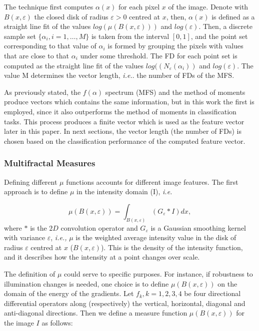 \documentclass[twocolumn]{bmcart}%
\begin{document}
The technique first computes $\alpha(x)$ for each pixel $x$ of the image. Denote with $B(x,\varepsilon)$ the closed disk of radius $\varepsilon > 0$ centred at $x$, then, $\alpha(x)$ is defined as a straight line fit of the values $log(\mu(B(x,\varepsilon)))$ and $log(\varepsilon)$. Then, a discrete sample set $\{\alpha_{i}, i = 1,\dots,M\}$ is taken from the interval $[0,1]$, and the point set corresponding to that value of $\alpha_{i}$ is formed by grouping the pixels with values that are close to that $\alpha_{i}$ under some threshold. The FD for each point set is computed as the straight line fit of the values $log((N_{\varepsilon}(\alpha_{i}))$ and $log(\varepsilon)$. The value M determines the vector length, {\em i.e.}. the number of FDs of the MFS.


As previously stated, the $f(\alpha)$ spectrum (MFS) and the method of moments produce vectors which contains the same information, but in this work the first is employed, since it also outperforms the method of moments in classification tasks. This process produces a finite vector which is used as the feature vector later in this paper. In next sections, the vector length (the number of FDs) is chosen based on the classification performance of the computed feature vector.


\subsubsection{Multifractal Measures}
Defining different $\mu$ functions accounts for different image features. The first approach is to define $\mu$ in the intensity domain (I), {\em i.e.}

\begin{equation}
\mu(B(x,\varepsilon)) = \int_{B(x,\varepsilon)}{(G_{\varepsilon} \ast I)} dx,
\label{eqn:eqn11}
\end{equation}
where $\ast$ is the $2D$ convolution operator and $G_{\varepsilon}$ is a Gaussian smoothing kernel with variance $\varepsilon$, {\em i.e., } $\mu$ is the weighted average intensity value in the disk of radius $\varepsilon$ centred at $x$ ($B(x,\varepsilon)$). This is the density of the intensity function, and it describes how the intensity at a point changes over scale.

The definition of $\mu$ could serve to specific purposes. For instance, if robustness to illumination changes is needed, one choice is to define $\mu(B(x,\varepsilon))$ on the domain of the energy of the gradients. Let ${ f_{k} , k = 1, 2, 3, 4}$ be four directional differential operators along (respectively) the vertical, horizontal, diagonal and anti-dia\-gonal directions. Then we define a measure function $\mu(B(x,\varepsilon))$ for the image $I$ as follows:
\end{document}
